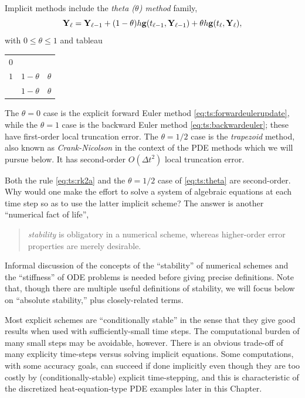 Implicit methods include the \emph{theta ($\theta$) method} family,
\begin{equation}
\mathbf{Y}_\ell = \mathbf{Y}_{\ell-1} + (1-\theta) h \mathbf{g}(t_{\ell-1},\mathbf{Y}_{\ell-1}) + \theta h \mathbf{g}(t_\ell,\mathbf{Y}_{\ell}),  \label{eq:ts:theta}
\end{equation}
with $0 \le \theta\le 1$ and tableau
\begin{center}
\begin{tabular}{c|cc}
$0$   \\
$1$ & $1-\theta$ & $\theta$ \\ \hline
    & $1-\theta$ & $\theta$
\end{tabular}
\end{center}
The $\theta=0$ case is the explicit forward Euler method \eqref{eq:ts:forwardeulerupdate}, while the $\theta=1$ case is the backward Euler method \eqref{eq:ts:backwardeuler}; these have first-order local truncation error.  The $\theta=1/2$ case is the \emph{trapezoid} method, also known as \emph{Crank-Nicolson} \citep{MortonMayers2005} in the context of the PDE methods which we will pursue below.  It has second-order $O(\Delta t^2)$ local truncation error.

Both the \RKtwoa rule \eqref{eq:ts:rk2a} and the $\theta=1/2$ case of \eqref{eq:ts:theta} are second-order.  Why would one make the effort to solve a system of algebraic equations at each time step so as to use the latter implicit scheme?  The answer is another ``numerical fact of life'',
\begin{quote}
\emph{stability} is obligatory in a numerical scheme, whereas higher-order error properties are merely desirable.
\end{quote}

Informal discussion of the concepts of the ``stability'' of numerical schemes and the ``stiffness'' of ODE problems is needed before giving precise definitions.  Note that, though there are multiple useful definitions of stability, we will focus below on ``absolute stability,'' plus closely-related terms.

Most explicit schemes are ``conditionally stable'' in the sense that they give good results when used with sufficiently-small time steps.  The computational burden of many small steps may be avoidable, however.  There is an obvious trade-off of many explicity time-steps versus solving implicit equations.  Some computations, with some accuracy goals, can succeed if done implicitly even though they are too costly by (conditionally-stable) explicit time-stepping, and this is characteristic of the discretized heat-equation-type PDE examples later in this Chapter.

